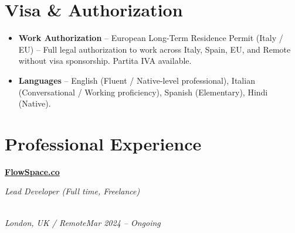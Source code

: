 \documentclass[a4paper,10pt]{article}
\newcommand{\role}[4]{\vspace{2pt}\noindent\hspace{0.6em}\parbox[t]{0.38\textwidth}{\raggedright\textbf{#1}}\hfill\parbox[t]{0.58\textwidth}{\raggedleft\textit{#2}}\\{\textit{#3}\hfill\textit{#4}}\vspace{1pt}}
\begin{document}
\section{Visa \& Authorization}
\begin{itemize}
\item \textbf{Work Authorization} -- European Long-Term Residence Permit (Italy / EU) -- Full legal authorization to work across Italy, Spain, EU, and Remote without visa sponsorship. Partita IVA available.
\item \textbf{Languages} -- English (Fluent / Native-level professional), Italian (Conversational / Working proficiency), Spanish (Elementary), Hindi (Native).
\end{itemize}

\section{Professional Experience}
\role{\href{https://flowspace.co}{FlowSpace.co}}{Lead Developer (Full time, Freelance)}{London, UK / Remote}{Mar 2024 -- Ongoing}
\end{document}
